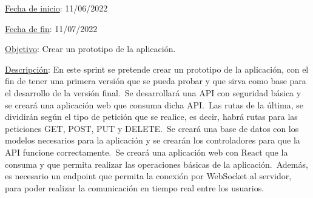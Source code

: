 
\underline{Fecha de inicio}: 11/06/2022

\underline{Fecha de fin}: 11/07/2022

\underline{Objetivo}:
Crear un prototipo de la aplicación.

\underline{Descripción}:
En este sprint se pretende crear un prototipo de la aplicación, con el fin de tener una primera versión
que se pueda probar y que sirva como base para el desarrollo de la versión final.\ Se desarrollará
una API con seguridad básica y se creará una aplicación web que consuma dicha API\@.\ Las rutas de la última\@,
se dividirán según el tipo de petición que se realice, es decir, habrá rutas para las peticiones GET, POST, PUT y
DELETE\@.\ Se creará una base de datos con los modelos necesarios para la aplicación y se crearán los controladores
para que la API funcione correctamente.\ Se creará una aplicación web con React que la consuma y que
permita realizar las operaciones básicas de la aplicación.\ Además, es necesario un endpoint que permita
la conexión por WebSocket al servidor, para poder realizar la comunicación en tiempo real entre los usuarios.


